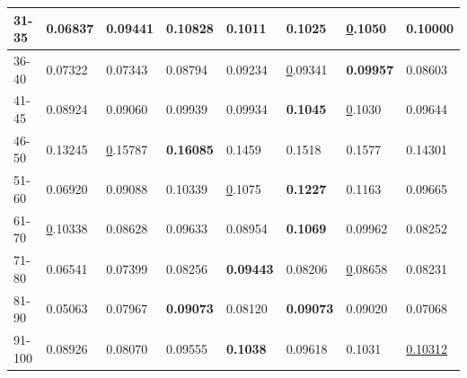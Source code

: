 \begin{table}[h!]
\begin{tabular}{|l|l|l|l|l|l|l||l|}
        31-35       & 0.06837                        & 0.09441                        & \textbf{0.10828}               & 0.1011                         & 0.1025                         & {\ul 0.1050}                    & 0.10000                    \\ \hline
        36-40       & 0.07322                        & 0.07343                        & 0.08794                        & 0.09234                        & {\ul 0.09341}                  & \textbf{0.09957}                & 0.08603                    \\ \hline
        41-45       & 0.08924                        & 0.09060                        & 0.09939                        & 0.09934                        & \textbf{0.1045}                & {\ul 0.1030}                    & 0.09644                    \\ \hline
        46-50       & 0.13245                        & {\ul 0.15787}                  & \textbf{0.16085}               & 0.1459                         & 0.1518                         & 0.1577                          & 0.14301                    \\ \hline
        51-60       & 0.06920                        & 0.09088                        & 0.10339                        & {\ul 0.1075}                   & \textbf{0.1227}                & 0.1163                          & 0.09665                    \\ \hline
        61-70       & {\ul 0.10338}                  & 0.08628                        & 0.09633                        & 0.08954                        & \textbf{0.1069}                & 0.09962                         & 0.08252                    \\ \hline
        71-80       & 0.06541                        & 0.07399                        & 0.08256                        & \textbf{0.09443}               & 0.08206                        & {\ul 0.08658}                   & 0.08231                    \\ \hline
        81-90       & 0.05063                        & 0.07967                        & \textbf{0.09073}               & 0.08120                        & \textbf{0.09073}               & 0.09020                         & 0.07068                    \\ \hline
        91-100      & 0.08926                        & 0.08070                        & 0.09555                        & \textbf{0.1038}                & 0.09618                        & 0.1031                          & \underline{0.10312}        \\ \hline

\end{tabular}
\end{table}
